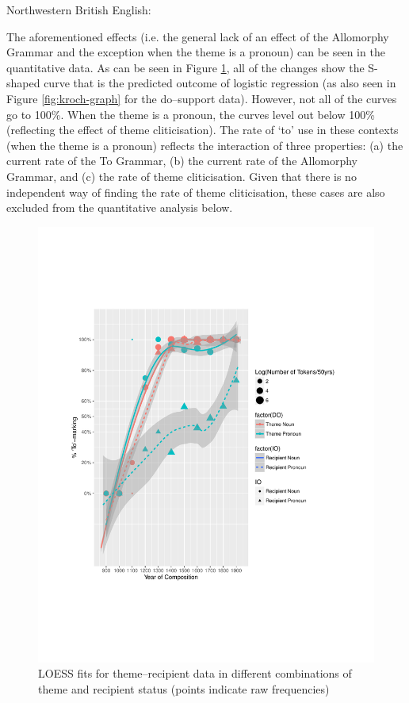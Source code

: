 	\begin{exe}
		 Northwestern British English:
		\begin{xlist}
	\end{xlist}
	\end{exe}

	The aforementioned effects (i.e. the general lack of an effect of the Allomorphy Grammar and the exception when the theme is a pronoun) can be seen in the quantitative data. As can be seen in Figure \ref{fig:brit-tr}, all of the changes show the S-shaped curve that is the predicted outcome of logistic regression (as also seen in Figure \ref{fig:kroch-graph} for the do--support data). However, not all of the curves go to 100\%. When the theme is a pronoun, the curves level out below 100\% (reflecting the effect of theme cliticisation). The rate of `to' use in these contexts (when the theme is a pronoun) reflects the interaction of three properties: (a) the current rate of the To Grammar, (b) the current rate of the Allomorphy Grammar, and (c) the rate of theme cliticisation. Given that there is no independent way of finding the rate of theme cliticisation, these cases are also excluded from the quantitative analysis below.

	\begin{figure}[ht!]
		\includegraphics[width=\linewidth]{../images/brit-tr}
		\caption{LOESS fits for theme--recipient data in different combinations of theme and recipient status (points indicate raw frequencies)}
		\label{fig:brit-tr}
	\end{figure}

